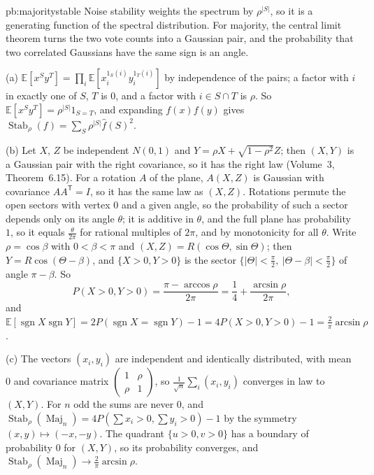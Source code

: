 \begin{solution}{pb:majoritystable}
\idea Noise stability weights the spectrum by $\rho^{|S|}$, so it is a generating function of the spectral distribution. For majority,
the central limit theorem turns the two vote counts into a Gaussian pair, and the probability that two correlated Gaussians have
the same sign is an angle.

\writeup (a) $\mathbb E[x^Sy^T]=\prod_i\mathbb E[x_i^{1_S(i)}y_i^{1_T(i)}]$ by independence of the pairs; a factor with $i$ in exactly one of $S$, $T$ is $0$, and a
factor with $i\in S\cap T$ is $\rho$. So $\mathbb E[x^Sy^T]=\rho^{|S|}1_{S=T}$, and expanding $f(x)f(y)$ gives $\operatorname{Stab}_\rho(f)=\sum_S\rho^{|S|}\hat f(S)^2$.

(b) Let $X$, $Z$ be independent $N(0,1)$ and $Y=\rho X+\sqrt{1-\rho^2}Z$; then $(X,Y)$ is a Gaussian pair with the right covariance, so it has the right
law (Volume~3, Theorem~6.15). For a rotation $A$ of the plane, $A(X,Z)$ is Gaussian with covariance $AA^{\mathsf T}=I$, so it has the same law as
$(X,Z)$. Rotations permute the open sectors with vertex $0$ and a given angle, so the probability of such a sector depends only on its
angle $\theta$; it is additive in $\theta$, and the full plane has probability $1$, so it equals $\frac\theta{2\pi}$ for rational multiples of $2\pi$, and by
monotonicity for all $\theta$. Write $\rho=\cos\beta$ with $0<\beta<\pi$ and $(X,Z)=R(\cos\Theta,\sin\Theta)$; then $Y=R\cos(\Theta-\beta)$, and $\{X>0,Y>0\}$ is the sector
$\{|\Theta|<\frac\pi2,\ |\Theta-\beta|<\frac\pi2\}$ of angle $\pi-\beta$. So
\[
P(X>0,Y>0)=\frac{\pi-\arccos\rho}{2\pi}=\frac14+\frac{\arcsin\rho}{2\pi},
\]
and $\mathbb E[\operatorname{sgn}X\operatorname{sgn}Y]=2P(\operatorname{sgn}X=\operatorname{sgn}Y)-1=4P(X>0,Y>0)-1=\frac2\pi\arcsin\rho$.

(c) The vectors $(x_i,y_i)$ are independent and identically distributed, with mean $0$ and covariance matrix $\begin{pmatrix}1&\rho\\\rho&1\end{pmatrix}$, so
$\frac1{\sqrt n}\sum_i(x_i,y_i)$ converges in law to $(X,Y)$. For $n$ odd the sums are never $0$, and $\operatorname{Stab}_\rho(\operatorname{Maj}_n)=4P(\sum x_i>0,\sum y_i>0)-1$ by the
symmetry $(x,y)\mapsto(-x,-y)$. The quadrant $\{u>0,v>0\}$ has a boundary of probability $0$ for $(X,Y)$, so its probability converges, and
$\operatorname{Stab}_\rho(\operatorname{Maj}_n)\to\frac2\pi\arcsin\rho$.


\end{solution}

